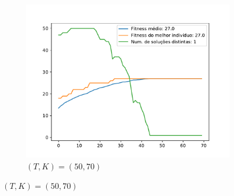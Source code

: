 \documentclass[11pt,a4paper]{article}
\begin{document}
\begin{figure}[!hb]
\begin{subfigure}[b]{0.33\textwidth}
		\includegraphics[width=\textwidth]{teste6_50_70.pdf}
		\caption{$(T,K)=(50,70)$}
	\end{subfigure}%
	

\end{figure}
\end{document}
